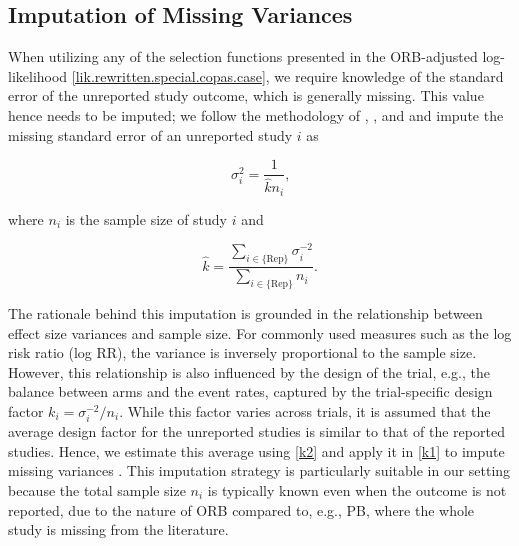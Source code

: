 \documentclass[twocolumn]{article}\usepackage[]{graphicx}\usepackage[]{xcolor}
\begin{document}
\subsection{Imputation of Missing Variances} \label{impvar}

When utilizing any of the selection functions presented in the ORB-adjusted log-likelihood \eqref{lik.rewritten.special.copas.case}, we require knowledge of the standard error of the unreported study outcome, which is generally missing. This value hence needs to be imputed; we follow the methodology of \citet{Copas2019}, \citet{Kirkham2012}, and \citet{Bay} and impute the missing standard error of an unreported study $i$ as

\begin{equation}
\label{k1}
\sigma_{i}^2 = \frac{1}{\hat{k} n_i} \text{,}
\end{equation}


where $n_i$ is the sample size of study $i$ and

\begin{equation}
\label{k2}
\hat{k} = \frac{\sum_{i \in \{\text{Rep} \} } \sigma_{i}^{-2}}{\sum_{i \in \{\text{Rep} \}} n_i} \text{.}
\end{equation}

\bigskip

The rationale behind this imputation is grounded in the relationship between effect size variances and sample size. For commonly used measures such as the log risk ratio (log RR), the variance is inversely proportional to the sample size. However, this relationship is also influenced by the design of the trial, e.g., the balance between arms and the event rates, captured by the trial-specific design factor \(k_i = \sigma_i^{-2}/n_i\). While this factor varies across trials, it is assumed that the average design factor for the unreported studies is similar to that of the reported studies. Hence, we estimate this average using \eqref{k2} and apply it in \eqref{k1} to impute missing variances \citep{Copas2019, Copas2014}. This imputation strategy is particularly suitable in our setting because the total sample size \(n_i\) is typically known even when the outcome is not reported, due to the nature of ORB compared to, e.g., PB, where the whole study is missing from the literature.

\bigskip

\end{document}
